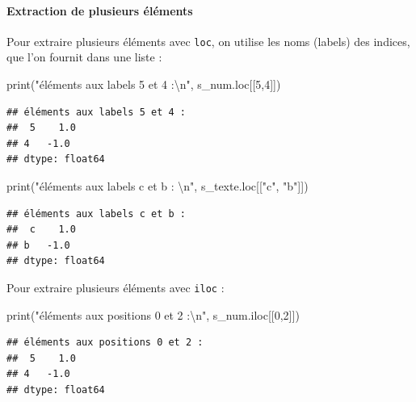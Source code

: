 \documentclass[12pt,]{book}
\newenvironment{Shaded}{\begin{snugshade}}{\end{snugshade}}
\newcommand{\DecValTok}[1]{\textcolor[rgb]{0.00,0.00,0.81}{#1}}
\newcommand{\CharTok}[1]{\textcolor[rgb]{0.31,0.60,0.02}{#1}}
\newcommand{\StringTok}[1]{\textcolor[rgb]{0.31,0.60,0.02}{#1}}
\newcommand{\BuiltInTok}[1]{#1}
\newcommand{\NormalTok}[1]{#1}
\let\oldparagraph\paragraph
\renewcommand{\paragraph}[1]{\oldparagraph{#1}\mbox{}}
\numberwithin{equation}{section}
\numberwithin{countremarque}{section}
\begin{document}
\paragraph{Extraction de plusieurs
éléments}\label{extraction-de-plusieurs-elements}

Pour extraire plusieurs éléments avec \texttt{loc}, on utilise les noms
(labels) des indices, que l'on fournit dans une liste :

\begin{Shaded}
\begin{Highlighting}[]
\BuiltInTok{print}\NormalTok{(}\StringTok{"éléments aux labels 5 et 4 :}\CharTok{\textbackslash{}n}\StringTok{"}\NormalTok{, s_num.loc[[}\DecValTok{5}\NormalTok{,}\DecValTok{4}\NormalTok{]])}
\end{Highlighting}
\end{Shaded}

\begin{lstlisting}
## éléments aux labels 5 et 4 :
##  5    1.0
## 4   -1.0
## dtype: float64
\end{lstlisting}

\begin{Shaded}
\begin{Highlighting}[]
\BuiltInTok{print}\NormalTok{(}\StringTok{"éléments aux labels c et b : }\CharTok{\textbackslash{}n}\StringTok{"}\NormalTok{, s_texte.loc[[}\StringTok{"c"}\NormalTok{, }\StringTok{"b"}\NormalTok{]])}
\end{Highlighting}
\end{Shaded}

\begin{lstlisting}
## éléments aux labels c et b : 
##  c    1.0
## b   -1.0
## dtype: float64
\end{lstlisting}

Pour extraire plusieurs éléments avec \texttt{iloc} :

\begin{Shaded}
\begin{Highlighting}[]
\BuiltInTok{print}\NormalTok{(}\StringTok{"éléments aux positions 0 et 2 :}\CharTok{\textbackslash{}n}\StringTok{"}\NormalTok{, s_num.iloc[[}\DecValTok{0}\NormalTok{,}\DecValTok{2}\NormalTok{]])}
\end{Highlighting}
\end{Shaded}

\begin{lstlisting}
## éléments aux positions 0 et 2 :
##  5    1.0
## 4   -1.0
## dtype: float64
\end{lstlisting}
\end{document}
